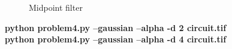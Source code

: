 \begin{figure}[!htb]\centering
    \begin{minipage}{0.45\textwidth}
        \caption{\small{Midpoint filter}}\label{diagram:gaussian_midpoint}
    \end{minipage}
\end{figure}


\pagebreak
\begin{minipage}{\textwidth}
\textbf{python problem4.py --gaussian --alpha -d 2 circuit.tif} \\
\textbf{python problem4.py --gaussian --alpha -d 4 circuit.tif} \\
\end{minipage}


